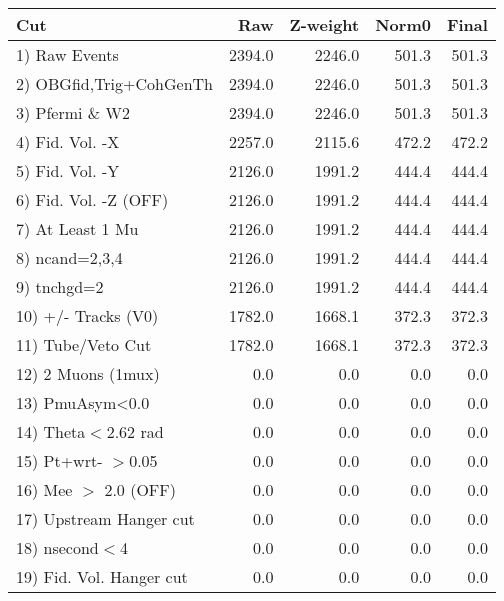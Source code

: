  \begin{table}[h!]\centering
 \begin{tabular}{||l||r|r|r|r||}
 \hline
 \hline
 Cut & Raw & Z-weight & Norm0 & Final \\
 \hline
  1) Raw Events           &      2394.0 &      2246.0 &       501.3 &       501.3 \\
  2) OBGfid,Trig+CohGenTh &      2394.0 &      2246.0 &       501.3 &       501.3 \\
  3) Pfermi \& W2         &      2394.0 &      2246.0 &       501.3 &       501.3 \\
  4) Fid. Vol. -X         &      2257.0 &      2115.6 &       472.2 &       472.2 \\
  5) Fid. Vol. -Y         &      2126.0 &      1991.2 &       444.4 &       444.4 \\
  6) Fid. Vol. -Z (OFF)   &      2126.0 &      1991.2 &       444.4 &       444.4 \\
  7) At Least 1 Mu        &      2126.0 &      1991.2 &       444.4 &       444.4 \\
  8) ncand=2,3,4          &      2126.0 &      1991.2 &       444.4 &       444.4 \\
  9) tnchgd=2             &      2126.0 &      1991.2 &       444.4 &       444.4 \\
 10) +/- Tracks (V0)      &      1782.0 &      1668.1 &       372.3 &       372.3 \\
 11) Tube/Veto Cut        &      1782.0 &      1668.1 &       372.3 &       372.3 \\
 12) 2 Muons (1mux)       &         0.0 &         0.0 &         0.0 &         0.0 \\
 13) PmuAsym<0.0          &         0.0 &         0.0 &         0.0 &         0.0 \\
 14) Theta$<$2.62 rad     &         0.0 &         0.0 &         0.0 &         0.0 \\
 15) Pt+wrt- $>$0.05      &         0.0 &         0.0 &         0.0 &         0.0 \\
 16) Mee $>$ 2.0  (OFF)   &         0.0 &         0.0 &         0.0 &         0.0 \\
 17) Upstream Hanger cut  &         0.0 &         0.0 &         0.0 &         0.0 \\
 18) nsecond$<$4          &         0.0 &         0.0 &         0.0 &         0.0 \\
 19) Fid. Vol. Hanger cut &         0.0 &         0.0 &         0.0 &         0.0 \\

\end{tabular}
\end{table}

